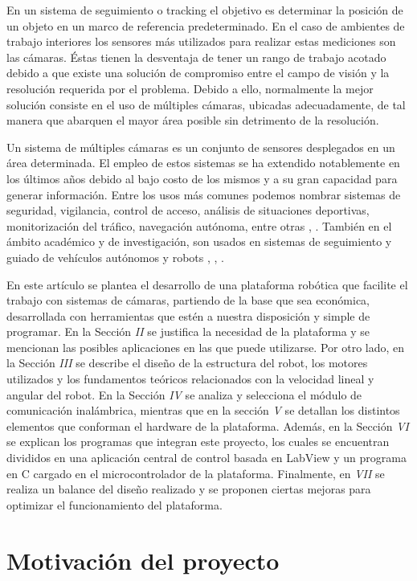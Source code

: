 \documentclass[conference,a4paper,9pt]{IEEEtran}
\begin{document}
En un sistema de seguimiento o tracking el objetivo es determinar la posición de un objeto en un marco de referencia predeterminado. En el caso de ambientes de trabajo interiores los sensores más utilizados para realizar estas mediciones son las cámaras. Éstas tienen la desventaja de tener un rango de trabajo acotado debido a que existe una solución de compromiso entre el campo de visión y la resolución requerida por el problema. Debido a ello, normalmente la mejor solución consiste en el uso de múltiples cámaras, ubicadas adecuadamente, de tal manera que abarquen el mayor área posible sin detrimento de la resolución.

Un sistema de múltiples cámaras es un conjunto de sensores desplegados en un área determinada. El empleo de estos sistemas se ha extendido notablemente en los últimos años debido al bajo costo de los mismos y a su gran capacidad para generar información. Entre los usos más comunes podemos nombrar sistemas de seguridad, vigilancia, control de acceso, análisis de situaciones deportivas, monitorización del tráfico, navegación autónoma, entre otras \cite{camara2}, \cite{camara3}. También en el ámbito académico y de investigación, son usados en sistemas de seguimiento y guiado de vehículos autónomos y robots \cite{camara1}, \cite{diego}, \cite{kulich}.

En este artículo se plantea el desarrollo de una plataforma robótica que facilite el trabajo con sistemas de cámaras, partiendo de la base que sea económica, desarrollada con herramientas que estén a nuestra disposición y simple de programar. En la Sección \textit{II} se justifica la necesidad de la plataforma y se mencionan las posibles aplicaciones en las que puede utilizarse. Por otro lado, en la Sección \textit{III} se describe el diseño de la estructura del robot, los motores utilizados y los fundamentos teóricos relacionados con la velocidad lineal y angular del robot. En la Sección \textit{IV} se analiza y selecciona el módulo de comunicación inalámbrica, mientras que en la sección \textit{V} se detallan los distintos elementos que conforman el hardware de la plataforma. Además, en la Sección \textit{VI} se explican los programas que integran este proyecto, los cuales se encuentran divididos en una aplicación central de control basada en LabView y un programa en C cargado en el microcontrolador de la plataforma. Finalmente, en \textit{VII} se realiza un balance del diseño realizado y se proponen ciertas mejoras para optimizar el funcionamiento del plataforma.

\section{Motivación del proyecto}
\end{document}
